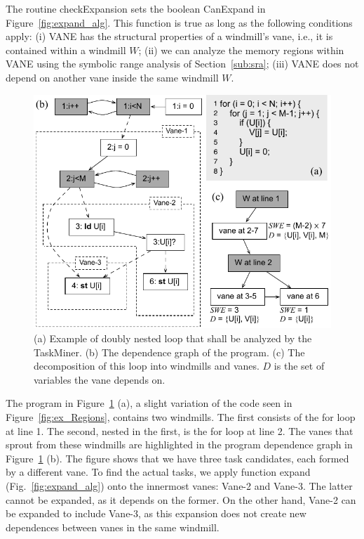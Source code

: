 \documentclass[sigplan,10pt,review,anonymous]{acmart}
\newcommand\Taskminer{\mbox{\textsf{TaskMiner}}}
\begin{document}
The routine \textsf{checkExpansion} sets the boolean \textsf{CanExpand} in
Figure~\ref{fig:expand_alg}.
This function is true as long as the following conditions apply:
(i) \textsf{VANE} has the structural properties of a
windmill's vane, i.e., it is contained within a windmill $W$;
(ii) we can analyze the memory regions within \textsf{VANE} using the
symbolic range analysis of Section~\ref{sub:sra};
(iii) \textsf{VANE} does not depend on another vane inside the same windmill $W$.

\begin{figure}[h]
\begin{center}
\includegraphics[width=1\columnwidth]{images/ex_expansion}
\caption{(a) Example of doubly nested loop that shall be analyzed by the 
\Taskminer.
(b) The dependence graph of the program.
(c) The decomposition of this loop into windmills and vanes.
$D$ is the set of variables the vane depends on.}
\label{fig:ex_expansion}
\end{center}
\end{figure}

The program in Figure~\ref{fig:ex_expansion} (a), a slight variation of
the code seen in Figure~\ref{fig:ex_Regions}, contains two windmills.
The first consists of the \textsf{for} loop at line 1.
The second, nested in the first, is the \textsf{for} loop at line 2.
The vanes that sprout from these windmills are highlighted in the program
dependence graph in Figure~\ref{fig:ex_expansion} (b).
The figure shows that we have three task candidates, each formed by a
different vane.
To find the actual tasks, we apply function \textsf{expand}
(Fig.~\ref{fig:expand_alg}) onto the innermost vanes: \textsf{Vane-2} and
\textsf{Vane-3}.
The latter cannot be expanded, as it depends on the former.
On the other hand, \textsf{Vane-2} can be expanded to include
\textsf{Vane-3}, as this expansion does not create new dependences between vanes
in the same windmill.
\end{document}

